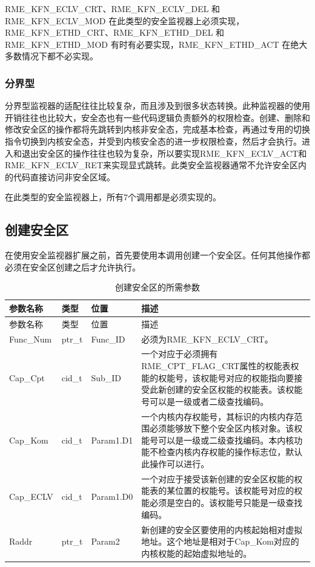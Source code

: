 RME\_KFN\_ECLV\_CRT、RME\_KFN\_ECLV\_DEL 和 RME\_KFN\_ECLV\_MOD 在此类型的安全监视器上必须实现，RME\_KFN\_ETHD\_CRT、RME\_KFN\_ETHD\_DEL 和 RME\_KFN\_ETHD\_MOD 有时有必要实现，RME\_KFN\_ETHD\_ACT 在绝大多数情况下都不必实现。

\subsubsection{分界型}\label{subsubsec:8-partition-type}

分界型监视器的适配往往比较复杂，而且涉及到很多状态转换。此种监视器的使用开销往往也比较大，安全态也有一些代码逻辑负责额外的权限检查。创建、删除和修改安全区的操作都将先跳转到内核非安全态，完成基本检查，再通过专用的切换指令切换到内核安全态，并受到内核安全态的进一步权限检查，然后才会执行。进入和退出安全区的操作往往也较为复杂，所以要实现RME\_KFN\_ECLV\_ACT和RME\_KFN\_ECLV\_RET来实现显式跳转。此类安全监视器通常不允许安全区内的代码直接访问非安全区域。

在此类型的安全监视器上，所有7个调用都是必须实现的。

\subsection{创建安全区}\label{subsec:8-create-enclave}

在使用安全监视器扩展之前，首先要使用本调用创建一个安全区。任何其他操作都必须在安全区创建之后才允许执行。

\begin{xltabular}{\textwidth}{@{}>{\hsize\raggedright\arraybackslash}X>{\hsize\raggedright\arraybackslash}X>{\hsize\raggedright\arraybackslash}X>{\hsize\raggedright\arraybackslash}X@{}}
\caption{创建安全区的所需参数}\label{tab:8-94-create-enclave-parameters}\\
\toprule
参数名称 & 类型 & 位置 & 描述\tabularnewline
\endfirsthead
\toprule
参数名称 & 类型 & 位置 & 描述\tabularnewline
\midrule
\endhead
\bottomrule
\endlastfoot
Func\_Num & ptr\_t & Func\_ID &
必须为RME\_KFN\_ECLV\_CRT。\tabularnewline
Cap\_Cpt & cid\_t & Sub\_ID &
一个对应于必须拥有RME\_CPT\_FLAG\_CRT属性的权能表权能的权能号，该权能号对应的权能指向要接受此新创建的安全区权能的权能表。该权能号可以是一级或者二级查找编码。\tabularnewline
Cap\_Kom & cid\_t & Param1.D1 &
一个内核内存权能号，其标识的内核内存范围必须能够放下整个安全区内核对象。该权能号可以是一级或二级查找编码。本内核功能不检查内核内存权能的操作标志位，默认此操作可以进行。\tabularnewline
Cap\_ECLV & cid\_t & Param1.D0 &
一个对应于接受该新创建的安全区权能的权能表的某位置的权能号。该权能号对应的权能必须是空白的。该权能号只能是一级查找编码。\tabularnewline
Raddr & ptr\_t & Param2 &
新创建的安全区要使用的内核起始相对虚拟地址。这个地址是相对于Cap\_Kom对应的内核权能的起始虚拟地址的。\tabularnewline
\end{xltabular}


